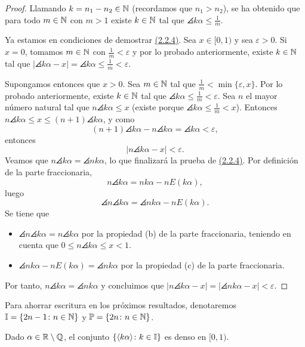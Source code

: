 \documentclass[a4paper, 12pt, oneside]{book}
\begin{document}
\begin{proof}
    Llamando $k = n_1-n_2 \in \mathbb N$ (recordamos que $n_1>n_2$), se ha obtenido que para todo $m \in \mathbb N$ con $m>1$ existe $k \in \mathbb N$ tal que $\angles{k\alpha} \leq \frac{1}{m}$.
    
    Ya estamos en condiciones de demostrar \hyperref[2.2.4]{\color{blue}(2.2.4)}. Sea $x \in [0,1)$ y sea $\varepsilon > 0$. Si $x = 0$, tomamos $m \in \mathbb N$ con $\frac{1}{m}<\varepsilon$ y por lo probado anteriormente, existe $k \in \mathbb N$ tal que $|\angles{k\alpha}-x| = \angles{k\alpha}  \leq \frac{1}{m}< \varepsilon$.
    
    Supongamos entonces que $x > 0$. Sea $m \in \mathbb N$ tal que $\frac{1}{m} < \min\{\varepsilon,x\}$. Por lo probado anteriormente, existe $k \in \mathbb N$ tal que $\angles{k\alpha} \leq \frac{1}{m}< \varepsilon$.
    Sea $n$ el mayor número natural tal que $n \angles{k\alpha} \leq x$ (existe porque $\angles{k\alpha} \leq \frac{1}{m} < x$). Entonces $n \angles{k\alpha} \leq x \leq (n+1)\angles{k\alpha}$, y como
    \[(n+1)\angles{k\alpha} - n\angles{k\alpha} = \angles{k\alpha} < \varepsilon,\]
    entonces
    \[|n\angles{k\alpha}-x| < \varepsilon.\]
    Veamos que $n\angles{k\alpha} = \angles{nk\alpha}$, lo que finalizará la prueba de \hyperref[2.2.4]{\color{blue}(2.2.4)}. Por definición de la parte fraccionaria,
    \[n\angles{k\alpha} = nk\alpha-nE( k\alpha ),\]
    luego 
    \[\angles{n\angles{k\alpha}} = \angles{nk\alpha-nE( k\alpha)}.\]
    Se tiene que
    \begin{itemize}
        \item $\angles{n\angles{k\alpha}} = n\angles{k\alpha}$ por la propiedad (b) de la parte fraccionaria, teniendo en cuenta que $0 \leq n\angles{k\alpha} \leq x < 1$.
        \item $\angles{nk\alpha-nE( k\alpha )} = \angles{nk\alpha}$ por la propiedad (c) de la parte fraccionaria.
    \end{itemize}
    Por tanto, $n\angles{k\alpha} = \angles{nk\alpha}$ y concluimos que $|n\angles{k\alpha}-x| = |\angles{nk\alpha}-x|<\varepsilon$.
\end{proof}

Para ahorrar escritura en los próximos resultados, denotaremos $\mathbb I = \{2n-1 \colon n \in \mathbb N\}$ y $\mathbb{P} = \{2n \colon n \in \mathbb N\}$.

\begin{lemma}
    Dado $\alpha \in \mathbb R \setminus \mathbb Q$, el conjunto $\{\langle k\alpha \rangle \colon k \in \mathbb I\}$ es denso en $[0,1)$.
\end{lemma}
\end{document}
